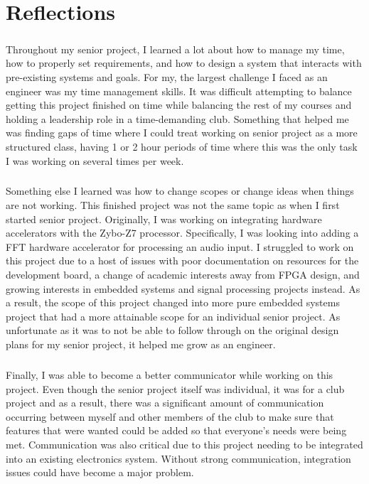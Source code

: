 \chapter{Reflections}

\paragraph{}
Throughout my senior project, I learned a lot about how to manage my time, how to properly set requirements, and how to design a system that interacts with pre-existing systems and goals.
For my, the largest challenge I faced as an engineer was my time management skills.
It was difficult attempting to balance getting this project finished on time while balancing the rest of my courses and holding a leadership role in a time-demanding club.
Something that helped me was finding gaps of time where I could treat working on senior project as a more structured class, having 1 or 2 hour periods of time where this was the only task I was working on several times per week.

\paragraph{}
Something else I learned was how to change scopes or change ideas when things are not working.
This finished project was not the same topic as when I first started senior project.
Originally, I was working on integrating hardware accelerators with the Zybo-Z7 processor.
Specifically, I was looking into adding a FFT hardware accelerator for processing an audio input.
I struggled to work on this project due to a host of issues with poor documentation on resources for the development board, a change of academic interests away from FPGA design, and growing interests in embedded systems and signal processing projects instead.
As a result, the scope of this project changed into more pure embedded systems project that had a more attainable scope for an individual senior project.
As unfortunate as it was to not be able to follow through on the original design plans for my senior project, it helped me grow as an engineer.

\paragraph{}
Finally, I was able to become a better communicator while working on this project.
Even though the senior project itself was individual, it was for a club project and as a result, there was a significant amount of communication occurring between myself and other members of the club to make sure that features that were wanted could be added so that everyone's needs were being met.
Communication was also critical due to this project needing to be integrated into an existing electronics system.
Without strong communication, integration issues could have become a major problem.